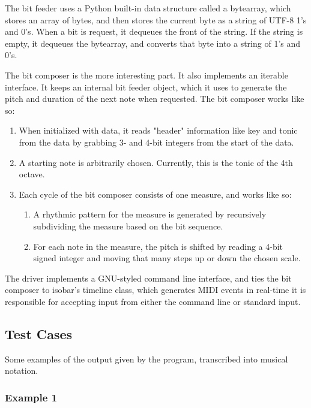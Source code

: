 \documentclass[runningheads,a4paper]{llncs}
\begin{document}
The bit feeder uses a Python built-in data structure called a bytearray, which
stores an array of bytes, and then stores the current byte as a string of UTF-8
1's and 0's. When a bit is request, it dequeues the front of the string. If the
string is empty, it dequeues the bytearray, and converts that byte into a string
of 1's and 0's.

The bit composer is the more interesting part. It also implements an iterable
interface. It keeps an internal bit feeder object, which it uses to generate the
pitch and duration of the next note when requested. The bit composer works like
so:

\begin{enumerate}
\item When initialized with data, it reads "header" information like key and
tonic from the data by grabbing 3- and 4-bit integers from the start of the
data.

\item A starting note is arbitrarily chosen. Currently, this is the tonic of the
4th octave.

\item Each cycle of the bit composer consists of one measure, and works like so:
    \begin{enumerate}
    \item A rhythmic pattern for the measure is generated by recursively
    subdividing the measure based on the bit sequence.

    \item For each note in the measure, the pitch is shifted by reading a 4-bit
    signed integer and moving that many steps up or down the chosen scale.
    \end{enumerate}
\end{enumerate}

The driver implements a GNU-styled command line interface, and ties the bit
composer to isobar's timeline class, which generates MIDI events in real-time it
is responsible for accepting input from either the command line or standard
input.

\subsection{Test Cases}

Some examples of the output given by the program, transcribed into musical
notation.

\subsubsection{Example 1}
\end{document}
